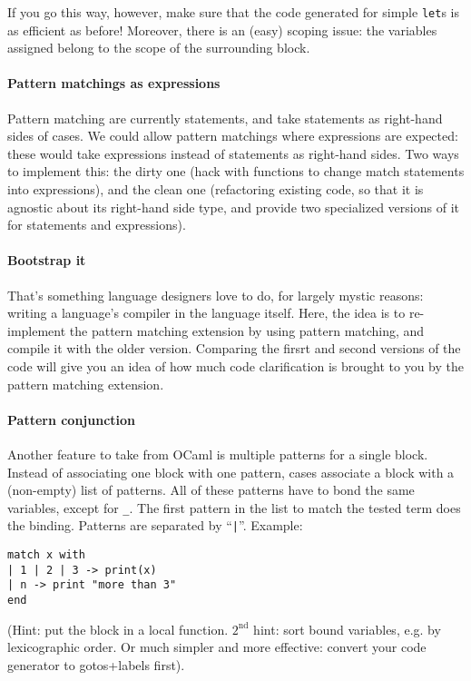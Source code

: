 If you go this way, however, make sure that the code generated for
simple {\tt let}s is as efficient as before! Moreover, there is an (easy) 
scoping issue: the variables assigned belong to the scope of the
surrounding block.

\paragraph{Pattern matchings as expressions}
Pattern matching are currently statements, and take statements as
right-hand sides of cases. We could allow pattern matchings where
expressions are expected: these would take expressions instead of
statements as right-hand sides. Two ways to implement this: the dirty
one (hack with functions to change match statements into expressions),
and the clean one (refactoring existing code, so that it is agnostic
about its right-hand side type, and provide two specialized
versions of it for statements and expressions).

\paragraph{Bootstrap it}
That's something language designers love to do, for largely mystic
reasons: writing a language's compiler in the language itself. Here,
the idea is to re-implement the pattern matching extension by using
pattern matching, and compile it with the older version. Comparing the
firsrt and second versions of the code will give you an idea of how
much code clarification is brought to you by the pattern matching
extension.

\paragraph{Pattern conjunction} Another feature to take from OCaml is
multiple patterns for a single block. Instead of associating one
block with one pattern, cases associate a block with a (non-empty)
list of patterns. All of these patterns have to bond the same
variables, except for {\tt\_}. The first pattern in the list to match
the tested term does the binding. Patterns are separated by
``\verb+|+''. Example:
\begin{verbatim}
match x with
| 1 | 2 | 3 -> print(x)
| n -> print "more than 3"
end
\end{verbatim}
(Hint: put the block in a local function. $2^{\mathrm{nd}}$ hint: sort
bound variables, e.g. by lexicographic order. Or much simpler and
more effective: convert your code generator to gotos+labels first).

